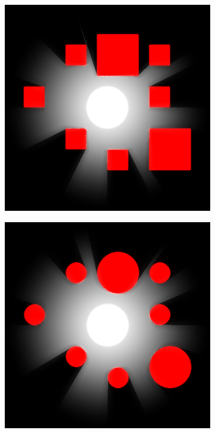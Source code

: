 \documentclass[../main/main.tex]{subfiles}
\begin{document}
\begin{figure}[H]
    \centering

    \begin{subfigure}[b]{0.3\columnwidth}
    \includegraphics[width=\columnwidth]{../testing/assets/rays_example_1.png}
    \end{subfigure}
    \begin{subfigure}[b]{0.3\columnwidth}
    \includegraphics[width=\columnwidth]{../testing/assets/rays_example_2.png}

\end{subfigure}
\end{figure}
\end{document}
